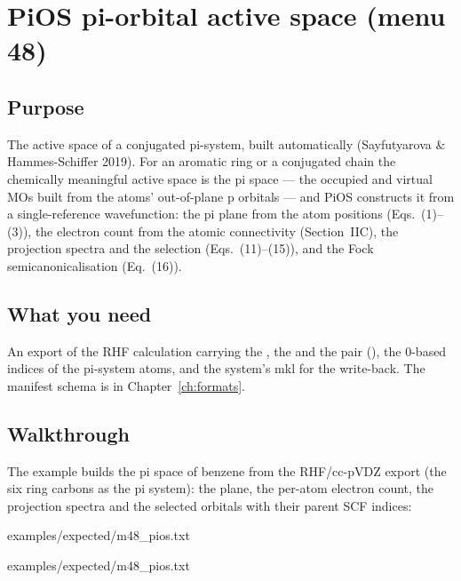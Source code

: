 \chapter{PiOS pi-orbital active space (menu 48)}
\label{ch:menu48}

\section{Purpose}

The active space of a conjugated pi-system, built automatically
(Sayfutyarova \& Hammes-Schiffer 2019).  For an aromatic ring or a
conjugated chain the chemically meaningful active space is the pi space
--- the occupied and virtual MOs built from the atoms' out-of-plane p
orbitals --- and PiOS constructs it from a single-reference wavefunction:
the pi plane from the atom positions (Eqs.~(1)--(3)), the electron count
from the atomic connectivity (Section~IIC), the projection spectra and the
selection (Eqs.~(11)--(15)), and the Fock semicanonicalisation
(Eq.~(16)).

\section{What you need}

An  export of the RHF calculation carrying the
, the  and the  pair
(), the 0-based indices of the pi-system atoms,
and the system's mkl for the write-back.  The manifest schema is in
Chapter~\ref{ch:formats}.

\section{Walkthrough}

The example builds the pi space of benzene from the RHF/cc-pVDZ export
(the six ring carbons as the pi system): the plane, the per-atom electron
count, the projection spectra and the selected orbitals with their parent
SCF indices:


  {examples/expected/m48_pios.txt}


  {examples/expected/m48_pios.txt}

